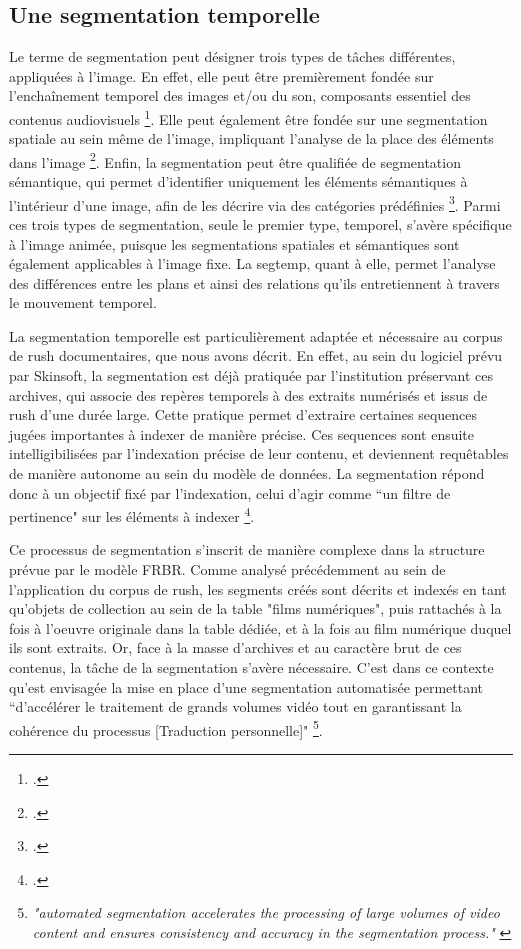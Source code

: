 \subsection{Une segmentation temporelle}

Le terme de segmentation peut désigner trois types de tâches différentes, appliquées à l'image. En effet, elle peut être premièrement fondée sur l'enchaînement temporel des images et/ou du son, composants essentiel des contenus audiovisuels \footcite{carrive2014}. Elle peut également être fondée sur une segmentation spatiale au sein même de l'image, impliquant l'analyse de la place des éléments dans l'image \footcite{zhou2022}. Enfin, la segmentation peut être qualifiée de segmentation sémantique, qui permet d'identifier uniquement les éléments sémantiques à l'intérieur d'une image, afin de les décrire via des catégories prédéfinies \footcite{zhou2022}. 
Parmi ces trois types de segmentation, seule le premier type, temporel, s'avère spécifique à l'image animée, puisque les segmentations spatiales et sémantiques sont également applicables à l'image fixe. La \gls{segtemp}, quant à elle, permet l'analyse des différences entre les plans et ainsi des relations qu'ils entretiennent à travers le mouvement temporel. 

La segmentation temporelle est particulièrement adaptée et nécessaire au corpus de \gls{rush} documentaires, que nous avons décrit. En effet, au sein du logiciel prévu par Skinsoft, la segmentation est déjà pratiquée par l’institution préservant ces archives, qui associe des repères temporels à des extraits numérisés et issus de \gls{rush} d'une durée large. Cette pratique permet d’extraire certaines \gls{sequence}s jugées importantes à indexer de manière précise. Ces \gls{sequence}s sont ensuite intelligibilisées par l’indexation précise de leur contenu, et deviennent requêtables de manière autonome au sein du modèle de données. La segmentation répond donc à un objectif fixé par l’indexation, celui d’agir comme “un filtre de pertinence" sur les éléments à indexer \footcite{stockinger2011}. 

Ce processus de segmentation s'inscrit de manière complexe dans la structure prévue par le modèle \gls{FRBR}. Comme analysé précédemment au sein de l'application du corpus de \gls{rush}, les segments créés sont décrits et indexés en tant qu'objets de collection au sein de la table "films numériques", puis rattachés à la fois à l'oeuvre originale dans la table dédiée, et à la fois au film numérique duquel ils sont extraits. Or, face à la masse d'archives et au caractère brut de ces contenus, la tâche de la segmentation s'avère nécessaire. C'est dans ce contexte qu'est envisagée la mise en place d’une segmentation automatisée permettant “d’accélérer le traitement de grands volumes vidéo tout en garantissant la cohérence du processus [Traduction personnelle]" \footnote{\textit{"automated segmentation accelerates the processing of large volumes of video content and ensures consistency and accuracy in the segmentation process."} \cite{attard2025}}. 

